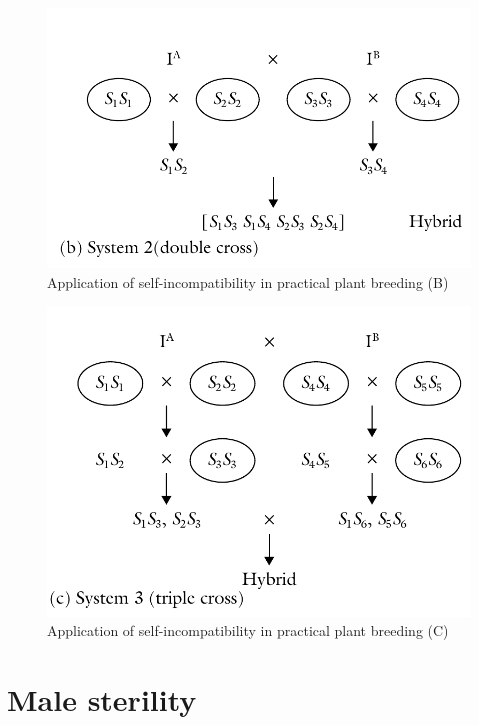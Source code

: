 \documentclass[11pt,ignorenonframetext,aspectratio=169]{beamer}
\begin{document}
\begin{frame}{}
\protect\hypertarget{section-9}{}
\begin{figure}

{\centering \includegraphics[width=0.5\linewidth]{./images/incompatibility_use_DC} 

}

\caption{Application of self-incompatibility in practical plant breeding (B)}\label{fig:si-use-dc}
\end{figure}
\end{frame}

\begin{frame}{}
\protect\hypertarget{section-10}{}
\begin{figure}

{\centering \includegraphics[width=0.5\linewidth]{./images/incompatibility_use_TC} 

}

\caption{Application of self-incompatibility in practical plant breeding (C)}\label{fig:si-use-tc}
\end{figure}
\end{frame}

\hypertarget{male-sterility}{%
\section{Male sterility}\label{male-sterility}}
\end{document}
